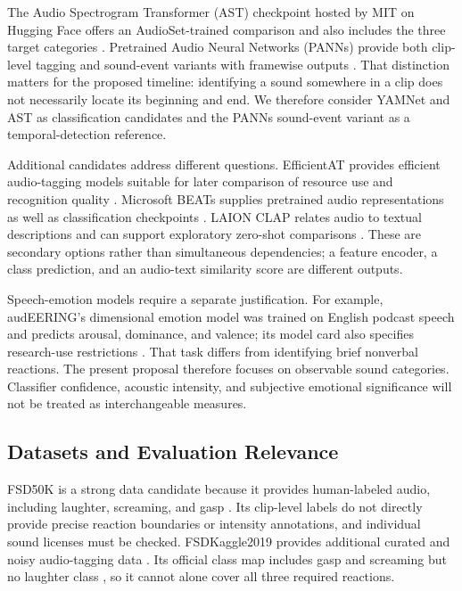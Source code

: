 The Audio Spectrogram Transformer (AST) checkpoint hosted by MIT on Hugging Face offers an AudioSet-trained comparison and also includes the three target categories \cite{ref9}. Pretrained Audio Neural Networks (PANNs) provide both clip-level tagging and sound-event variants with framewise outputs \cite{ref10}. That distinction matters for the proposed timeline: identifying a sound somewhere in a clip does not necessarily locate its beginning and end. We therefore consider YAMNet and AST as classification candidates and the PANNs sound-event variant as a temporal-detection reference.

Additional candidates address different questions. EfficientAT provides efficient audio-tagging models suitable for later comparison of resource use and recognition quality \cite{ref11}. Microsoft BEATs supplies pretrained audio representations as well as classification checkpoints \cite{ref12}. LAION CLAP relates audio to textual descriptions and can support exploratory zero-shot comparisons \cite{ref13}. These are secondary options rather than simultaneous dependencies; a feature encoder, a class prediction, and an audio-text similarity score are different outputs.

Speech-emotion models require a separate justification. For example, audEERING's dimensional emotion model was trained on English podcast speech and predicts arousal, dominance, and valence; its model card also specifies research-use restrictions \cite{ref14}. That task differs from identifying brief nonverbal reactions. The present proposal therefore focuses on observable sound categories. Classifier confidence, acoustic intensity, and subjective emotional significance will not be treated as interchangeable measures.

\subsection{Datasets and Evaluation Relevance}

FSD50K is a strong data candidate because it provides human-labeled audio, including laughter, screaming, and gasp \cite{ref15}. Its clip-level labels do not directly provide precise reaction boundaries or intensity annotations, and individual sound licenses must be checked. FSDKaggle2019 provides additional curated and noisy audio-tagging data \cite{ref16}. Its official class map includes gasp and screaming but no laughter class \cite{ref17}, so it cannot alone cover all three required reactions.

